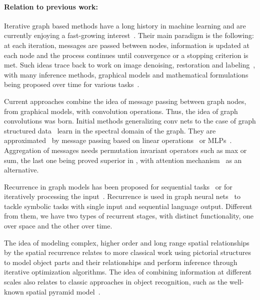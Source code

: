 \documentclass{article}
\begin{document}
\paragraph{Relation to previous work:}
Iterative graph based methods have a long history in machine learning
and are currently enjoying a fast-growing interest~\cite{battaglia2018relational, pmlr-v70-gilmer17a}. Their main paradigm is the following: at each iteration, messages are passed between nodes, information is updated at each node and the process continues until convergence or a stopping criterion is met. Such ideas trace back to work on image denoising, restoration and labeling~\cite{besag1986statistical,hummel1983foundations,geman1984stochastic,geman1986markov}, with many inference methods, graphical models and mathematical formulations being proposed over time for various tasks~\cite{lafferty2001conditional,kumar2006discriminative,pearl2014probabilistic,ravikumar2006quadratic,schaeffer2007graph,leordeanu2012unsupervised,ng2002spectral}.

Current approaches combine the idea of message passing between graph nodes, from graphical models, with convolution operations. Thus, the idea of graph convolutions was born. Initial methods generalizing conv nets to the case of graph structured data~\cite{DBLP:journals/corr/BrunaZSL13_bruna_lecun_spectral,henaff2015deep,defferrard2016convolutional} learn in the spectral domain of the graph. They are approximated~\cite{kipf2017semi} by message passing based on linear operations~\cite{duvenaud2015convolutional} or MLPs~\cite{battaglia2016interaction}. Aggregation of messages needs permutation invariant operators such as max or sum, the last one being proved superior in \cite{xu2018how_powerful}, with attention mechanism~\cite{velickovic2018graph_gat} as an alternative.

Recurrence in graph models has been proposed for sequential tasks~\cite{li2016gated, jain2016structural} or for iteratively processing the input~\cite{dehghani2018universal_transformer, NIPS2018_7960_transformer}. Recurrence is used in graph neural nets~\cite{li2016gated} to tackle symbolic tasks with single input and sequential language output. Different from them, we have two types of recurrent stages, with distinct functionality, one over space and the other over time.

The idea of modeling complex, higher order and long range spatial relationships by the spatial recurrence relates to more classical work using pictorial structures~\cite{felzenszwalb2005pictorial} to model object parts and their relationships and perform inference through iterative optimization algorithms. The idea of combining information at different scales also relates to classic approaches in object recognition, such as the well-known spatial pyramid model~\cite{lazebnik2006beyond, he2015spatial_pyramid}.
\end{document}
